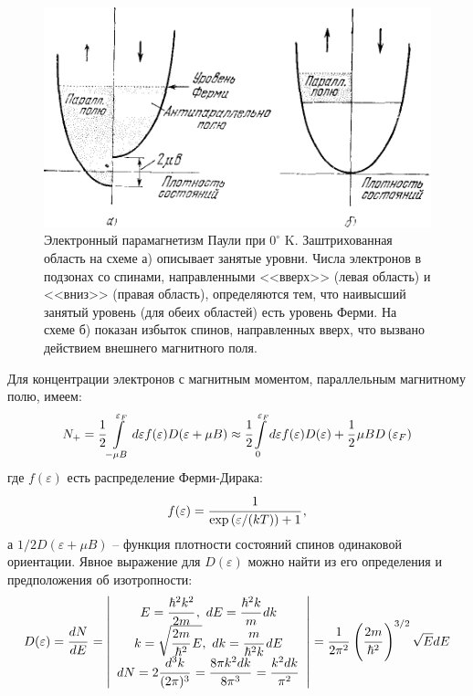 \documentclass[a4paper, 12pt, openany]{book}
\begin{document}
    \begin{figure}[!h]
        \includegraphics[width=\textwidth]{parabola}
        \caption{
        Электронный парамагнетизм Паули при $0^{\circ}$ K.
        Заштрихованная область на схеме а) описывает занятые уровни.
        Числа электронов в подзонах со спинами, направленными <<вверх>> (левая область) и <<вниз>> (правая область), определяются тем, что наивысший занятый уровень (для обеих областей) есть уровень Ферми.
        На схеме б) показан избыток спинов, направленных вверх, что вызвано действием внешнего магнитного поля.
    }
        \label{fig:parabola}
    \end{figure}
    Для концентрации электронов с магнитным моментом, параллельным магнитному полю, имеем:
    \begin{equation}
        N_{+}=\cfrac{1}{2} \int\limits_{-\mu B}^{\varepsilon_{F}} d \varepsilon f(\varepsilon) D(\varepsilon+\mu B) \approx \cfrac{1}{2} \int\limits_{0}^{\varepsilon_{F}} d \varepsilon f(\varepsilon) D(\varepsilon)+\cfrac{1}{2}\, \mu B D\left(\varepsilon_{F}\right)
        \label{eq:N+}
    \end{equation}
    где $f (\varepsilon)$ есть распределение Ферми-Дирака: 
    \begin{equation}
        f (\varepsilon) = \cfrac{1}{\exp\left(\varepsilon / (kT) \right) + 1}\, ,
        \label{eq:fermi_dirak_statistics}
    \end{equation}
    а $1 / 2 D(\varepsilon + \mu B)$ -- функция плотности состояний спинов одинаковой ориентации. Явное выражение для $D(\varepsilon)$ можно найти из его определения и предположения об изотропности:
    \begin{equation*}
        D(\varepsilon) = \cfrac{dN}{dE}\, = \left|
        \begin{array}{c}
            E = \cfrac{\hbar^2 k^2}{2m}\, ,
            ~ dE = \cfrac{\hbar^2k}{m}\, dk \\
            k = \sqrt{\cfrac{2m}{\hbar^2}\, E}, ~
            dk = \cfrac{m}{\hbar^2 k}\, dE \\
            dN = 2\cfrac{d^3k}{(2\pi)^3}\, = \cfrac{8 \pi k^2 dk}{8 \pi^3}\, = \cfrac{k^2 dk}{\pi^2}\, 
        \end{array}
        \right| = \cfrac{1}{2\pi^2}\, \left(\cfrac{2m}{\hbar^2}\, \right)^{3 / 2}  \sqrt{E} dE  
    \end{equation*}
\end{document}
